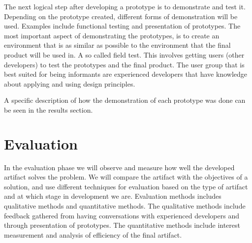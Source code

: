 \documentclass{report}
\begin{document}
The next logical step after developing a prototype is to demonstrate and test it. Depending on the prototype created, different forms of demonstration will be used. Examples include functional testing and presentation of prototypes. The most important aspect of demonstrating the prototypes, is to create an environment that is as similar as possible to the environment that the final product will be used in. A so called field test. This involves getting users (other developers) to test the prototypes and the final product. The user group that is best suited for being informants are experienced developers that have knowledge about applying and using design principles.



A specific description of how the demonstration of each prototype was done can be seen in the results section.

 
\section{Evaluation}
In the evaluation phase we will observe and measure how well the developed artifact solves the problem. We will compare the artifact with the objectives of a solution, and use different techniques for evaluation based on the type of artifact and at which stage in development we are. Evaluation methods includes qualitative methods and quantitative methods. The qualitative methods include feedback gathered from having conversations with experienced developers and through presentation of prototypes. The quantitative methods include interest measurement and analysis of efficiency of the final artifact.   
\end{document}
